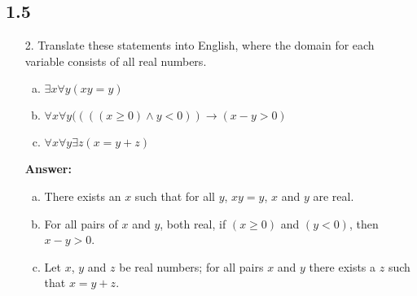 \subsection{1.5}
\begin{itemize}
    \item[2.] Translate these statements into English, where the domain for each
          variable consists of all real numbers.
          \begin{enumerate}[a.]
              \item $\exists x \forall y (xy = y)$
              \item $\forall x \forall y ((((x \geq 0) \land y < 0)) \to (x - y > 0)$
              \item $\forall x \forall y \exists z (x = y + z)$
          \end{enumerate}
          \textbf{Answer:}
          \begin{enumerate}[a.]
              \item There exists an $x$ such that for all $y$, $xy = y$, $x$ and $y$ are real.
              \item For all pairs of $x$ and $y$, both real, if $(x \geq 0)$ and $(y < 0)$, then $x - y > 0$.
              \item Let $x$, $y$ and $z$ be real numbers; for all pairs $x$ and $y$ there exists a $z$ such that $x = y + z$.
          \end{enumerate}


\end{itemize}
